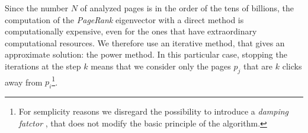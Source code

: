 Since the number $N$ of analyzed pages is in the order of the tens of billions,
the computation of the \emph{PageRank} eigenvector with a direct method is
computationally expensive, even for the ones that have extraordinary
computational resources. We therefore use an iterative method, that gives an
approximate solution: the power method. In this particular case, stopping the
iterations at the step $k$ means that we consider only the pages $p_j$ that
are $k$ clicks away from $p_i$\footnote{For semplicity reasons we disregard the
possibility to introduce a \emph{damping fatctor} \cite{Brin1998}, that does
not modify the basic principle of the algorithm.}.
